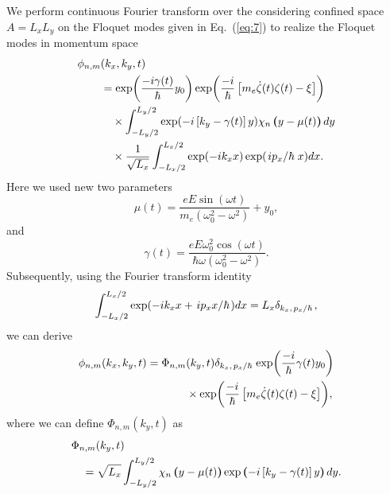 \documentclass[
 reprint,
 amsmath,amssymb,
 aps,
 prb,
]{revtex4-2}
\begin{document}
\begin{appendix}
We perform continuous Fourier transform over the considering confined space $A=L_xL_y$ on the Floquet modes given in Eq.~(\ref{eq:7}) to realize the Floquet modes in momentum space
\begin{equation} \label{eq:b8}
  \begin{aligned}
    \phi_{n,m}&(k_x,k_y,t) \\
    & =
    \exp(\frac{-i\gamma(t)}{\hbar}y_0)
    \exp(\frac{-i}{\hbar}\left[m_e \dot{\zeta}(t) \zeta(t) - \xi \right]) \\
    & \quad\times
    \int_{-L_y/2}^{L_y/2} \exp(-i \left[k_y - \gamma(t) \right]y)
      \chi_n \bm{\left(}y - \mu(t)\bm{\right)} dy \\
    & \quad\times
    \frac{1}{\sqrt{L_x}} \int_{-L_x/2}^{L_x/2}
     \exp(-ik_x x)\exp( \flatfrac{i p_x }{\hbar}x ) dx.
  \end{aligned}
\end{equation}
Here we used new two parameters
\begin{equation} \label{eq:b9}
  \mu(t) = \frac{eE\sin(\omega t)}{m_e(\omega_0^2 - \omega^2)} + y_0,
\end{equation}
and
\begin{equation} \label{eq:b10}
  \gamma(t) =
  \frac{eE\omega_0^2\cos(\omega t)}{\hbar\omega(\omega_0^2 - \omega^2)}.
\end{equation}
Subsequently, using the Fourier transform identity \cite{bruus04}
\begin{equation} \label{eq:b11}
  \int_{-L_x/2}^{L_x/2}
  \exp( -ik_x x + \flatfrac{i p_x x}{\hbar}) dx =
  L_x \delta_{k_x,\flatfrac{p_x}{\hbar}},
\end{equation}
we can derive
\begin{equation} \label{eq:b12}
  \begin{aligned}
    \phi_{n,m}(k_x,k_y,t)  =
    \Phi_{n,m}&(k_y,t)
    \delta_{k_x,\flatfrac{p_x}{\hbar}}
    \exp(\frac{-i}{\hbar} \gamma(t)y_0) \\
    & \times
    \exp(\frac{-i}{\hbar}
    \left[ m_e \dot{\zeta}(t) \zeta(t) - \xi \right]),
  \end{aligned}
\end{equation}
where we can define $\Phi_{n,m}(k_y,t)$ as
\begin{equation} \label{eq:b13}
  \begin{aligned}
    &\Phi_{n,m}(k_y,t) \\
    & \quad=
    \sqrt{L_x}
    \int_{-L_y/2}^{L_y/2}
    \chi_n \bm{\left(}y - \mu(t)\bm{\right)}
    \exp \bm{\left(}-i\left[k_y - \gamma(t) \right]y\bm{\right)} dy.

\end{aligned}
\end{equation}
\end{appendix}
\end{document}
